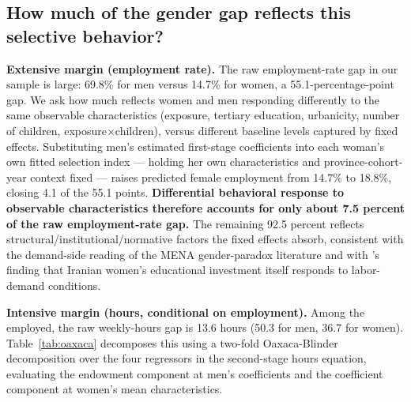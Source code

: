 \documentclass[11pt]{article}
\begin{document}
\subsection{How much of the gender gap reflects this selective behavior?}

\textbf{Extensive margin (employment rate).} The raw employment-rate gap in our sample is large: 69.8\% for men versus 14.7\% for women, a 55.1-percentage-point gap. We ask how much reflects women and men responding differently to the same observable characteristics (exposure, tertiary education, urbanicity, number of children, exposure$\times$children), versus different baseline levels captured by fixed effects. Substituting men's estimated first-stage coefficients into each woman's own fitted selection index --- holding her own characteristics and province-cohort-year context fixed --- raises predicted female employment from 14.7\% to 18.8\%, closing 4.1 of the 55.1 points. \textbf{Differential behavioral response to observable characteristics therefore accounts for only about 7.5 percent of the raw employment-rate gap.} The remaining 92.5 percent reflects structural/institutional/normative factors the fixed effects absorb, consistent with the demand-side reading of the MENA gender-paradox literature and with \citet{tanaka2023}'s finding that Iranian women's educational investment itself responds to labor-demand conditions.

\textbf{Intensive margin (hours, conditional on employment).} Among the employed, the raw weekly-hours gap is 13.6 hours (50.3 for men, 36.7 for women). Table~\ref{tab:oaxaca} decomposes this using a two-fold Oaxaca-Blinder decomposition over the four regressors in the second-stage hours equation, evaluating the endowment component at men's coefficients and the coefficient component at women's mean characteristics.
\end{document}

